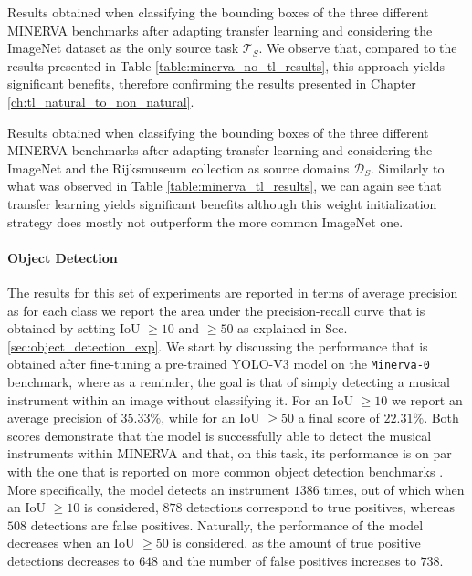 \begin{table}[ht!]
	\caption{Results obtained when classifying the bounding boxes of the three different MINERVA benchmarks after adapting transfer learning and considering the ImageNet dataset as the only source task $\mathcal{T}_S$. We observe that, compared to the results presented in Table \ref{table:minerva_no_tl_results}, this approach yields significant benefits, therefore confirming the results presented in Chapter \ref{ch:tl_natural_to_non_natural}.}
\resizebox{\columnwidth}{!}{%
}
\label{table:minerva_tl_results}
\end{table}


\begin{table}[ht!]
	\caption{Results obtained when classifying the bounding boxes of the three different MINERVA benchmarks after adapting transfer learning and considering the ImageNet and the Rijksmuseum collection as source domains $\mathcal{D}_S$. Similarly to what was observed in Table \ref{table:minerva_tl_results}, we can again see that transfer learning yields significant benefits although this weight initialization strategy does mostly not outperform the more common ImageNet one.}
\resizebox{\columnwidth}{!}{%
}
\label{table:minerva_rijks_results}
\end{table}


\paragraph{Object Detection}
The results for this set of experiments are reported in terms of average precision as for each class we report the area under the precision-recall curve that is obtained by setting IoU $\geq10$ and $\geq50$ as explained in Sec. \ref{sec:object_detection_exp}. We start by discussing the performance that is obtained after fine-tuning a pre-trained YOLO-V3 model on the \texttt{Minerva-0} benchmark, where as a reminder, the goal is that of simply detecting a musical instrument within an image without classifying it. For an IoU $\geq 10$ we report an average precision of $35.33\%$, while for an IoU $\geq 50$ a final score of $22.31\%$. Both scores demonstrate that the model is successfully able to detect the musical instruments within MINERVA and that, on this task, its performance is on par with the one that is reported on more common object detection benchmarks \cite{}. More specifically, the model detects an instrument $1386$ times, out of which when an IoU $\geq 10$ is considered, $878$ detections correspond to true positives, whereas $508$ detections are false positives. Naturally, the performance of the model decreases when an IoU $\geq 50$ is considered, as the amount of true positive detections decreases to $648$ and the number of false positives increases to $738$.

